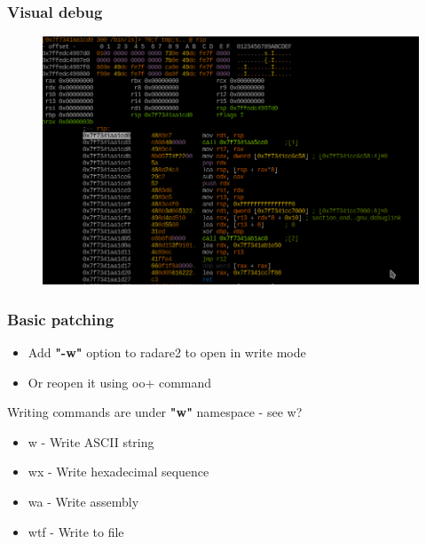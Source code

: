 \documentclass[10pt,pdf,utf8,english,compress,hyperref={unicode}]{beamer}
\begin{document}
\begin{frame}[fragile]
	\frametitle{Visual debug}
	\begin{figure}
		\includegraphics[width=\linewidth]{r2visualdebug.png}
	\end{figure}
\end{frame}

\begin{frame}[fragile]
  \frametitle{Basic patching}
  \begin{itemize}
	  \item Add \textbf{"-w"} option to radare2 to open in write mode
	  \item Or reopen it using \alert{oo+} command
  \end{itemize}
  Writing commands are under \textbf{"w"} namespace - see \alert{w?}
  \begin{itemize}
	  \item \alert{w} - Write ASCII string
	  \item \alert{wx} - Write hexadecimal sequence
	  \item \alert{wa} - Write assembly
	  \item \alert{wtf} - Write to file
  \end{itemize}
\end{frame}
\end{document}
